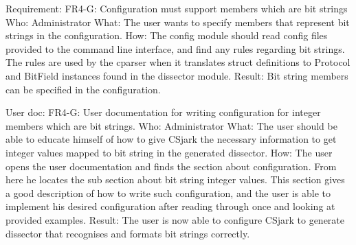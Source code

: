 Requirement: FR4-G: Configuration must support members which are bit strings
Who: Administrator
What: The user wants to specify members that represent bit strings in the configuration.
How: The config module should read config files provided to the command line interface, and find any rules regarding bit strings. The rules are used by the cparser when it translates struct definitions to Protocol and BitField instances found in the dissector module.
Result: Bit string members can be specified in the configuration.

User doc: FR4-G: User documentation for writing configuration for integer members which are bit strings.
Who: Administrator
What: The user should be able to educate himself of how to give CSjark the necessary information to get integer values mapped to bit string in the generated dissector.
How: The user opens the user documentation and finds the section about configuration. From here he locates the sub section about bit string integer values. This section gives a good description of how to write such configuration, and the user is able to implement his desired configuration after reading through once and looking at provided examples.
Result: The user is now able to configure CSjark to generate dissector that recognises and formats bit strings correctly.

